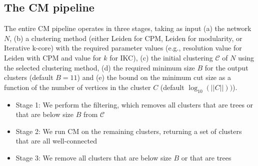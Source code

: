 \documentclass[12pt, oneside]{article}   	%
\begin{document}
\subsection{The CM pipeline}
The entire CM pipeline operates in three stages, taking as input (a) the
network $N$,  (b) a clustering method (either Leiden for CPM, Leiden for modularity, or Iterative k-core) with the required
parameter values (e.g., resolution value for Leiden with CPM and value for $k$ for IKC),
(c)  the initial clustering $\mathcal{C}$ of $N$ using the selected clustering method, 
(d) the required minimum size $B$ for the output clusters (default $B=11$)
and (e) the bound on the minimum cut size as a function of the number of vertices in the cluster $C$
(default $\log_{10}(||C||))$).

\begin{itemize}
\item Stage 1: We perform the filtering, which removes all clusters that are trees or that are below size $B$ from $\mathcal{C}$
\item Stage 2: We run CM on the remaining clusters, returning a set of clusters that are all well-connected
\item Stage 3: We remove all clusters that are below size $B$ or that are trees
\end{itemize}




\end{document}
